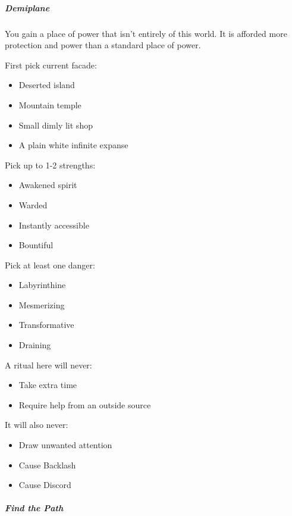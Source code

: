 \documentclass[
]{article}
\begin{document}
\hypertarget{demiplane}{%
\subparagraph{Demiplane}\label{demiplane}}

You gain a place of power that isn't entirely of this world. It is
afforded more protection and power than a standard place of power.

First pick current facade:

\begin{itemize}
\item
  Deserted island
\item
  Mountain temple
\item
  Small dimly lit shop
\item
  A plain white infinite expanse
\end{itemize}

Pick up to 1-2 strengths:

\begin{itemize}
\item
  Awakened spirit
\item
  Warded
\item
  Instantly accessible
\item
  Bountiful
\end{itemize}

Pick at least one danger:

\begin{itemize}
\item
  Labyrinthine
\item
  Mesmerizing
\item
  Transformative
\item
  Draining
\end{itemize}

A ritual here will never:

\begin{itemize}
\item
  Take extra time
\item
  Require help from an outside source
\end{itemize}

It will also never:

\begin{itemize}
\item
  Draw unwanted attention
\item
  Cause Backlash
\item
  Cause Discord
\end{itemize}

\hypertarget{find-the-path}{%
\subparagraph{Find the Path}\label{find-the-path}}
\end{document}
